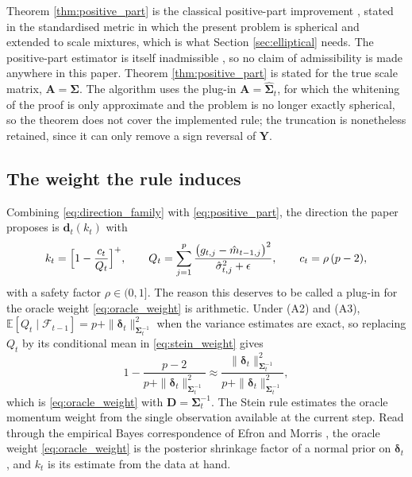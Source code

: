 \documentclass[pdflatex,sn-mathphys-num]{sn-jnl}%
\theoremstyle{thmstyleone}%
\theoremstyle{thmstyletwo}%
\theoremstyle{thmstylethree}%
\newcommand{\rev}[1]{#1}
\newcommand{\E}{\mathbb{E}}
\begin{document}
Theorem \ref{thm:positive_part} is the classical positive-part improvement \cite{baranchik1970, lehmann1998}, stated in the standardised metric in which the present problem is spherical and extended to scale mixtures, which is what Section \ref{sec:elliptical} needs. The positive-part estimator is itself inadmissible \cite{shao1994}, so no claim of admissibility is made anywhere in this paper. \rev{Theorem \ref{thm:positive_part} is stated for the true scale matrix, $\bm A=\bm\Sigma$. The algorithm uses the plug-in $\bm A=\widehat{\bm\Sigma}_t$, for which the whitening of the proof is only approximate and the problem is no longer exactly spherical, so the theorem does not cover the implemented rule; the truncation is nonetheless retained, since it can only remove a sign reversal of $\bm Y$.}

\subsection{The weight the rule induces}

Combining \eqref{eq:direction_family} with \eqref{eq:positive_part}, the direction the paper proposes is $\bm d_t(k_t)$ with
\begin{equation}
\label{eq:stein_weight}
k_t=\Bigl[1-\frac{c_t}{Q_t}\Bigr]^{+},
\qquad
Q_t=\sum_{j=1}^{p}\frac{\bigl(g_{t,j}-\hat m_{t-1,j}\bigr)^2}{\hat\sigma^2_{t,j}+\epsilon},
\qquad
c_t=\rho\,(p-2),
\end{equation}
with a safety factor $\rho\in(0,1]$. The reason this deserves to be called a plug-in for the oracle weight \eqref{eq:oracle_weight} is arithmetic. Under (A2) and (A3), $\E[Q_t\mid\mathcal F_{t-1}]=p+\|\bm\delta_t\|^2_{\bm\Sigma_t^{-1}}$ when the variance estimates are exact, so replacing $Q_t$ by its conditional mean in \eqref{eq:stein_weight} gives
\begin{equation}
1-\frac{p-2}{p+\|\bm\delta_t\|^2_{\bm\Sigma_t^{-1}}}
\approx
\frac{\|\bm\delta_t\|^2_{\bm\Sigma_t^{-1}}}{p+\|\bm\delta_t\|^2_{\bm\Sigma_t^{-1}}},
\end{equation}
which is \eqref{eq:oracle_weight} with $\bm D=\bm\Sigma_t^{-1}$. The Stein rule estimates the oracle momentum weight from the single observation available at the current step. Read through the empirical Bayes correspondence of Efron and Morris \cite{efronmorris1973, efron2012}, the oracle weight \eqref{eq:oracle_weight} is the posterior shrinkage factor of a normal prior on $\bm\delta_t$, and $k_t$ is its estimate from the data at hand.
\end{document}
